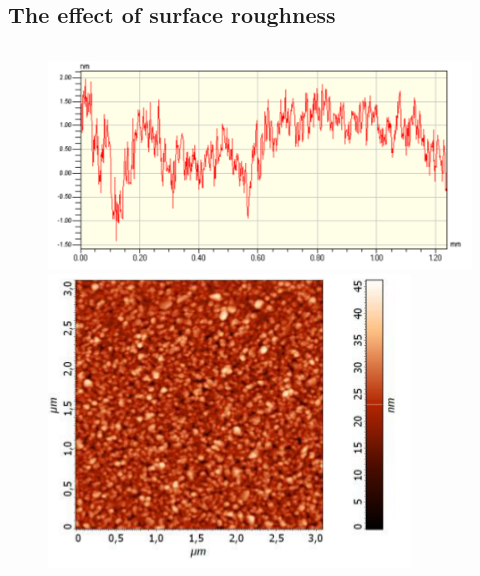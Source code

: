 \documentclass{beamer}
\begin{document}
\begin{frame}
\end{frame}

\subsection{The effect of surface roughness}
\begin{frame}
	\begin{columns}
		\begin{column}{0.5\textwidth}
			\begin{figure}[htb]
				\includegraphics[width=\textwidth]{../images/multilayer/plp-afm-chropo-1d.png}\\
				\includegraphics[width=\textwidth]{../images/multilayer/plp-afm-chropo.png}\\

\end{figure}
\end{column}
\end{columns}
\end{frame}
\end{document}
